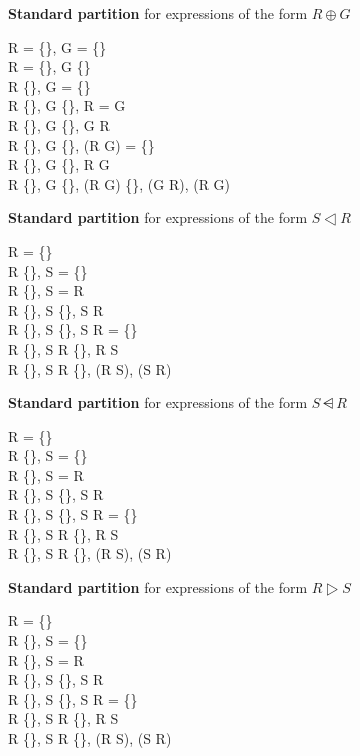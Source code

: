 \noindent\textbf{Standard partition} for expressions of the form $R \oplus G$
\begin{zed}
R = \{\}, G = \{\} \\
R = \{\}, G \neq \{\} \\
R \neq \{\}, G = \{\} \\
R \neq \{\}, G \neq \{\}, \dom R = \dom G \\
R \neq \{\}, G \neq \{\}, \dom G \subset \dom R \\
R \neq \{\}, G \neq \{\}, (\dom R \cap \dom G) = \{\} \\
R \neq \{\}, G \neq \{\}, \dom R \subset \dom G \\
R \neq \{\}, G \neq \{\}, (\dom R \cap \dom G) \neq \{\}, \lnot(\dom G
\subseteq \dom R), \lnot(\dom R \subseteq \dom G)
\end{zed}

\noindent\textbf{Standard partition} for expressions of the form $S \dres R$
\begin{zed}
R = \{\} \\
R \neq \{\}, S = \{\} \\
R \neq \{\}, S = \dom R \\
R \neq \{\}, S \neq \{\}, S \subset \dom R \\
R \neq \{\}, S \neq \{\}, S \cap \dom R = \{\} \\
R \neq \{\}, S \cap \dom R \neq \{\}, \dom R \subset S \\
R \neq \{\}, S \cap \dom R \neq \{\}, \lnot(\dom R \subseteq S), \lnot(S \subseteq \dom R)
\end{zed}


\noindent\textbf{Standard partition} for expressions of the form $S \ndres R$
\begin{zed}
R = \{\} \\
R \neq \{\}, S = \{\} \\
R \neq \{\}, S = \dom R \\
R \neq \{\}, S \neq \{\}, S \subset \dom R \\
R \neq \{\}, S \neq \{\}, S \cap \dom R = \{\} \\
R \neq \{\}, S \cap \dom R \neq \{\}, \dom R \subset S \\
R \neq \{\}, S \cap \dom R \neq \{\}, \lnot(\dom R \subseteq S), \lnot(S \subseteq \dom R) 
\end{zed}

\noindent\textbf{Standard partition} for expressions of the form $R \rres S$
\begin{zed}
R = \{\} \\
R \neq \{\}, S = \{\} \\
R \neq \{\}, S = \ran R \\
R \neq \{\}, S \neq \{\}, S \subset \ran R \\
R \neq \{\}, S \neq \{\}, S \cap \ran R = \{\} \\
R \neq \{\}, S \cap \ran R \neq \{\}, \ran R \subset S \\
R \neq \{\}, S \cap \ran R \neq \{\}, \lnot(\ran R \subseteq S), \lnot(S \subseteq \ran R)
\end{zed}


